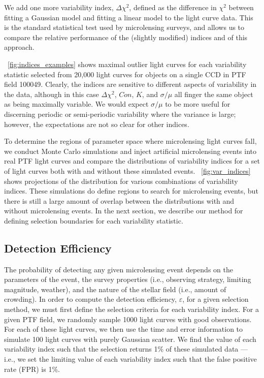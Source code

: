 \documentclass[12pt,preprint]{aastex}
\newcommand{\apwsim}{\raisebox{0.2ex}{\scriptsize$\sim$\normalsize}}
\begin{document}
We add one more variability index, $\Delta \chi^2$, defined as the difference in $\chi^2$ between fitting a Gaussian model and fitting a linear model to the light curve data. This is the standard statistical test used by microlensing surveys, and allows us to compare the relative performance of the (slightly modified) \cite{shin2009} indices and of this approach. 

\figurename~\ref{fig:indices_examples} shows maximal outlier light curves for each variability statistic selected from \apwsim20,000 light curves for objects on a single CCD in PTF field 100049. Clearly, the indices are sensitive to different aspects of variability in the data, although in this case $\Delta \chi^2$, $Con$, $K$, and $\sigma/\mu$ all finger the same object as being maximally variable. We would expect $\sigma/\mu$ to be more useful for discerning periodic or semi-periodic variability where the variance is large; however, the expectations are not so clear for other indices. 

To determine the regions of parameter space where microlensing light curves fall, we conduct Monte Carlo simulations and inject artificial microlensing events into real PTF light curves and compare the distributions of variability indices for a set of light curves both with and without these simulated events. \figurename~\ref{fig:var_indices} shows projections of the distribution for various combinations of variability indices. These simulations do define regions to search for microlensing events, but there is still a large amount of overlap between the distributions with and without microlensing events. In the next section, we describe our method for defining selection boundaries for each variability statistic.


\subsection{Detection Efficiency}
The probability of detecting any given microlensing event depends on the parameters of the event, the survey properties (i.e., observing strategy, limiting magnitude, weather), and the nature of the stellar field (i.e., amount of crowding). In order to compute the detection efficiency, $\varepsilon$, for a given selection method, we must first define the selection criteria for each variability index. For a given PTF field, we randomly sample 1000 light curves with good observations\citep[these have no photometric flags; see description of processing pipeline in][]{nick2009}. For each of these light curves, we then use the time and error information to simulate 100 light curves with purely Gaussian scatter. We find the value of each variability index such that the selection returns 1\% of these simulated data --- i.e., we set the limiting value of each variability index such that the false positive rate (FPR) is 1\%.
\end{document}
